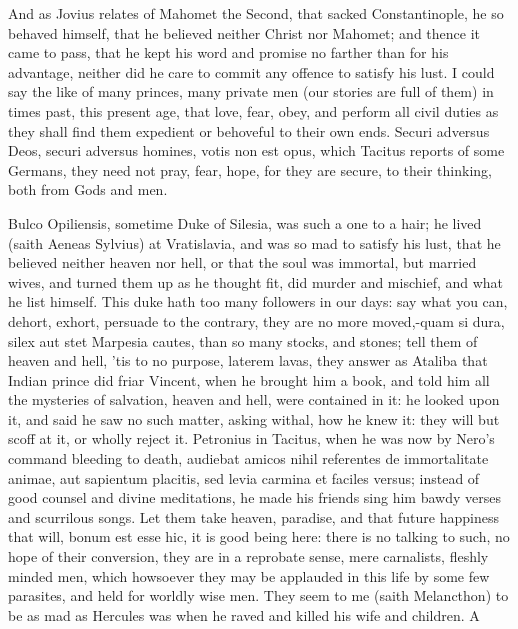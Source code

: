 {And as Jovius relates of Mahomet the Second, that sacked
Constantinople, he so behaved himself, that he believed neither Christ
nor Mahomet; and thence it came to pass, that he kept his word and
promise no farther than for his advantage, neither did he care to
commit any offence to satisfy his lust. I could say the like of many
princes, many private men (our stories are full of them) in times past,
this present age, that love, fear, obey, and perform all civil duties
as they shall find them expedient or behoveful to their own ends.
Securi adversus Deos, securi adversus homines, votis non est opus,
which  Tacitus reports of some Germans, they need not pray, fear,
hope, for they are secure, to their thinking, both from Gods and men.

Bulco Opiliensis, sometime Duke of Silesia, was such a one to a
hair; he lived (saith Aeneas Sylvius) at Vratislavia, and
was so mad to satisfy his lust, that he believed neither heaven nor
hell, or that the soul was immortal, but married wives, and turned them
up as he thought fit, did murder and mischief, and what he list
himself. This duke hath too many followers in our days: say what you
can, dehort, exhort, persuade to the contrary, they are no more
moved,-quam si dura, silex aut stet Marpesia cautes, than so many
stocks, and stones; tell them of heaven and hell, 'tis to no purpose,
laterem lavas, they answer as Ataliba that Indian prince did friar
Vincent, when he brought him a book, and told him all the
mysteries of salvation, heaven and hell, were contained in it: he
looked upon it, and said he saw no such matter, asking withal, how he
knew it: they will but scoff at it, or wholly reject it. Petronius in
Tacitus, when he was now by Nero's command bleeding to death, audiebat
amicos nihil referentes de immortalitate animae, aut sapientum
placitis, sed levia carmina et faciles versus; instead of good counsel
and divine meditations, he made his friends sing him bawdy verses and
scurrilous songs. Let them take heaven, paradise, and that future
happiness that will, bonum est esse hic, it is good being here: there
is no talking to such, no hope of their conversion, they are in a
reprobate sense, mere carnalists, fleshly minded men, which howsoever
they may be applauded in this life by some few parasites, and held for
worldly wise men. They seem to me (saith Melancthon) to be as mad
as Hercules was when he raved and killed his wife and children. A
}
